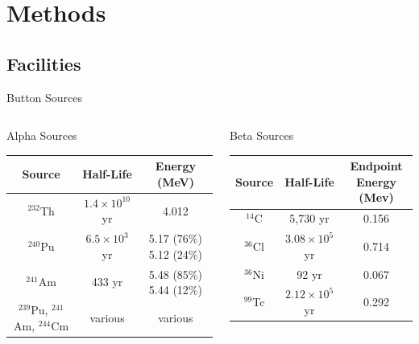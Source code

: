 
% 
%
\section{Methods}


\subsection{Facilities}
\begin{frame}{Button Sources}
\begin{columns}[onlytextwidth]
\begin{column}{0.45\textwidth}
	Alpha Sources
	\begin{table}[h]
		\tiny
		\begin{tabular}{c | c c}
		Source & Half-Life & Energy (MeV) \\
		\hline
		\hline
		${}^{232}$Th & $1.4\times10^{10}$ yr & 4.012 \\
		${}^{240}$Pu & $6.5\times10^{3}$ yr & 5.17 (76\%) 5.12 (24\%) \\
		${}^{241}$Am & 433 yr & 5.48 (85\%) 5.44 (12\%) \\
		${}^{239}$Pu, ${}^{241}$Am, ${}^{244}$Cm  & various & various \\
		\hline
		\end{tabular}
	\end{table}
\end{column}
\begin{column}{0.45\textwidth}
	Beta Sources
	\begin{table}[h]
		\tiny
		\begin{tabular}{c | c c}
		Source & Half-Life & Endpoint Energy (Mev)\\
		\hline
		\hline
		${}^{14}$C &  5,730 yr & 0.156 \\
		${}^{36}$Cl & $3.08\times10^{5}$ yr & 0.714 \\
		${}^{36}$Ni &  92 yr & 0.067 \\
		${}^{99}$Tc & $2.12\times10^{5}$ yr & 0.292 \\
		\hline
		\end{tabular}
	\end{table}
\end{column}
\end{columns}
\end{frame}

